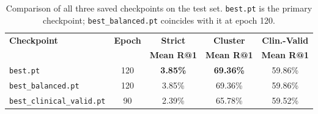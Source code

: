 \documentclass[11pt, a4paper]{article}
\begin{document}
\begin{table}[H]
  \centering
  \caption{Comparison of all three saved checkpoints on the test set.
    \texttt{best.pt} is the primary checkpoint; \texttt{best\_balanced.pt}
    coincides with it at epoch 120.}
  \label{tab:ckpts}
  \renewcommand{\arraystretch}{1.1}
  \begin{tabular}{lcccc}
    \toprule
    \textbf{Checkpoint} & \textbf{Epoch} &
    \textbf{Strict} & \textbf{Cluster} & \textbf{Clin.-Valid} \\
    & & \textbf{Mean R@1} & \textbf{Mean R@1} & \textbf{Mean R@1} \\
    \midrule
    \texttt{best.pt}                  & 120 & \textbf{3.85\%} & \textbf{69.36\%} & 59.86\% \\
    \texttt{best\_balanced.pt}        & 120 & 3.85\% & 69.36\% & 59.86\% \\
    \texttt{best\_clinical\_valid.pt} & 90  & 2.39\% & 65.78\% & 59.52\% \\
    \bottomrule
  \end{tabular}
\end{table}
\end{document}
